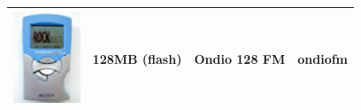 \begin{center}
\begin{tabularx}{\textwidth}{llXl}
\begin{minipage}{2.2cm}
      \includegraphics[width=2cm]{getting_started/images/archos-ondiofm-small.png}
    \end{minipage}
                     & 128MB (flash) & Ondio 128 FM & ondiofm \\\bottomrule
  \end{tabularx}
\end{center}


